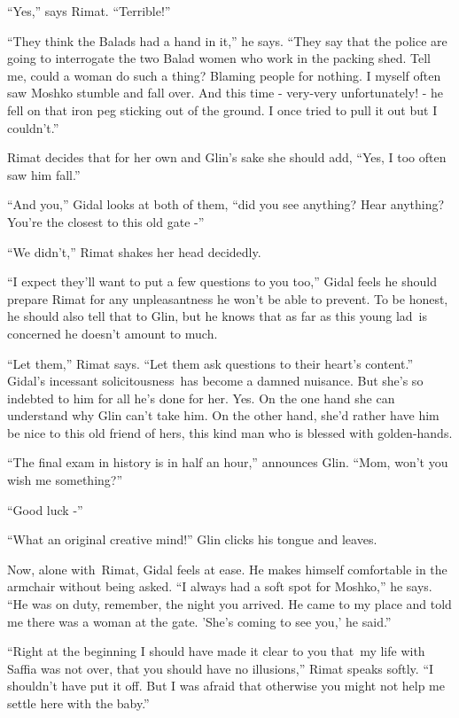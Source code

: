 \documentclass[twoside,11pt]{book}
\begin{document}
``Yes,'' says Rimat. ``Terrible!'' 

``They think the Balads had a hand in it,'' he says. ``They say that the police
are going to interrogate the two Balad women who work in the packing shed. Tell me, could a woman do such a thing?
Blaming people for nothing. I myself often saw Moshko stumble and fall over. And this time - very{}-very unfortunately!
- he fell on that iron peg sticking out of the ground. I once tried to pull it out but I couldn't.'' 

Rimat decides that for her own and Glin's sake she should add, ``Yes, I too often saw him
fall.'' 

``And you,'' Gidal looks at both of them, ``did you see anything? Hear anything?
You're the closest to this old gate -'' 

``We didn't,'' Rimat shakes her head decidedly. 

``I expect they'll want to put a few questions to you too,'' Gidal feels he should prepare
Rimat for any unpleasantness he won't be able to prevent. To be honest, he should also tell that to Glin, but he knows
that as far as this young lad~is concerned he doesn't amount to much. 

``Let them,'' Rimat says. ``Let them ask questions to their heart's
content.'' Gidal's incessant solicitousness~has become a damned nuisance. But she's so indebted to him for
all he's done for her. Yes. On the one hand she can understand why Glin can't take him. On the other hand, she'd rather
have him be nice to this old friend of hers, this kind man who is blessed with golden-hands.

``The final exam in history is in half an hour,'' announces Glin. ``Mom, won't
you wish me something?'' 

``Good luck -'' 

``What an original creative mind!'' Glin clicks his tongue and leaves.

Now, alone with~Rimat, Gidal feels at ease. He makes himself comfortable in the armchair without being asked.
``I always had a soft spot for Moshko,'' he says. ``He was on duty, remember,
the night you arrived. He came to my place and told me there was a woman at the gate. 'She's coming to see you,{}' he
said.'' 

``Right at the beginning I should have made it clear to you that~my life with Saffia was not over, that you
should have no illusions,'' Rimat speaks softly. ``I shouldn't have put it off. But I was afraid that otherwise you
might not help me settle here with the baby.'' 
\end{document}
